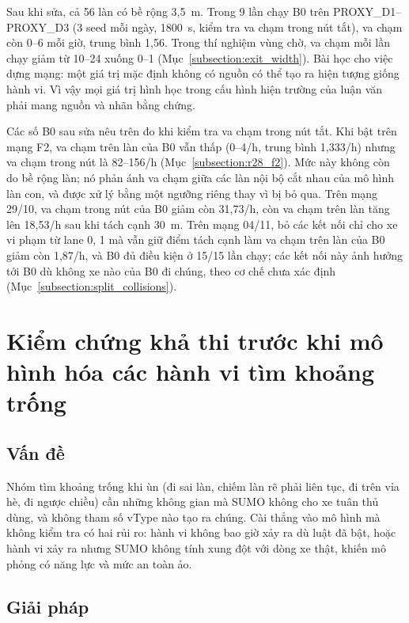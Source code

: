 \documentclass[../main.tex]{subfiles}
\begin{document}
Sau khi sửa, cả 56 làn có bề rộng 3,5~m. Trong 9 lần chạy B0 trên PROXY\_D1--PROXY\_D3 (3 seed mỗi ngày, 1800~s, kiểm tra va chạm trong nút tắt), va chạm còn 0--6 mỗi giờ, trung bình 1,56. Trong thí nghiệm vùng chờ, va chạm mỗi lần chạy giảm từ 10--24 xuống 0--1 (Mục~\ref{subsection:exit_width}). Bài học cho việc dựng mạng: một giá trị mặc định không có nguồn có thể tạo ra hiện tượng giống hành vi. Vì vậy mọi giá trị hình học trong cấu hình hiện trường của luận văn phải mang nguồn và nhãn bằng chứng.

Các số B0 sau sửa nêu trên đo khi kiểm tra va chạm trong nút tắt. Khi bật trên mạng F2, va chạm trên làn của B0 vẫn thấp (0--4/h, trung bình 1,333/h) nhưng va chạm trong nút là 82--156/h (Mục~\ref{subsection:r28_f2}). Mức này không còn do bề rộng làn; nó phản ánh va chạm giữa các làn nội bộ cắt nhau của mô hình làn con, và được xử lý bằng một ngưỡng riêng thay vì bị bỏ qua. Trên mạng 29/10, va chạm trong nút của B0 giảm còn 31,73/h, còn va chạm trên làn tăng lên 18,53/h sau khi tách cạnh 30~m. Trên mạng 04/11, bỏ các kết nối chỉ cho xe vi phạm từ lane 0, 1 mà vẫn giữ điểm tách cạnh làm va chạm trên làn của B0 giảm còn 1,87/h, và B0 đủ điều kiện ở 15/15 lần chạy; các kết nối này ảnh hưởng tới B0 dù không xe nào của B0 đi chúng, theo cơ chế chưa xác định (Mục~\ref{subsection:split_collisions}).

\section{Kiểm chứng khả thi trước khi mô hình hóa các hành vi tìm khoảng trống}
\label{section:5.6}

\subsection{Vấn đề}

Nhóm tìm khoảng trống khi ùn (đi sai làn, chiếm làn rẽ phải liên tục, đi trên vỉa hè, đi ngược chiều) cần những không gian mà SUMO không cho xe tuân thủ dùng, và không tham số vType nào tạo ra chúng. Cài thẳng vào mô hình mà không kiểm tra có hai rủi ro: hành vi không bao giờ xảy ra dù luật đã bật, hoặc hành vi xảy ra nhưng SUMO không tính xung đột với dòng xe thật, khiến mô phỏng có năng lực và mức an toàn ảo.

\subsection{Giải pháp}
\end{document}
